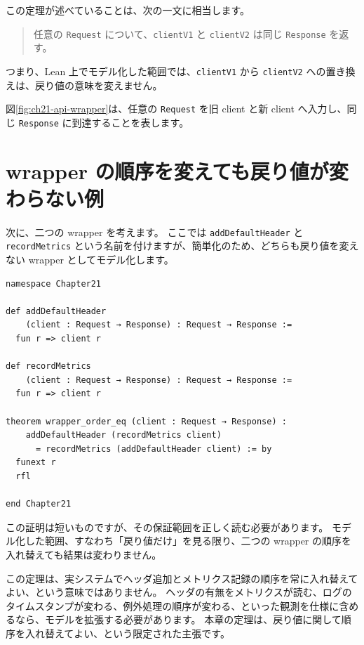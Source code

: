 この定理が述べていることは、次の一文に相当します。

\begin{quote}
任意の \texttt{Request} について、\texttt{clientV1} と \texttt{clientV2} は同じ \texttt{Response} を返す。
\end{quote}

つまり、Lean 上でモデル化した範囲では、\texttt{clientV1} から \texttt{clientV2} への置き換えは、戻り値の意味を変えません。

図\ref{fig:ch21-api-wrapper}は、任意の \texttt{Request} を旧 client と新 client へ入力し、同じ \texttt{Response} に到達することを表します。


\section{wrapper の順序を変えても戻り値が変わらない例}

次に、二つの wrapper を考えます。
ここでは \texttt{addDefaultHeader} と \texttt{recordMetrics} という名前を付けますが、簡単化のため、どちらも戻り値を変えない wrapper としてモデル化します。

\begin{listing}[htbp]
\begin{verbatim}
namespace Chapter21

def addDefaultHeader
    (client : Request → Response) : Request → Response :=
  fun r => client r

def recordMetrics
    (client : Request → Response) : Request → Response :=
  fun r => client r

theorem wrapper_order_eq (client : Request → Response) :
    addDefaultHeader (recordMetrics client)
      = recordMetrics (addDefaultHeader client) := by
  funext r
  rfl

end Chapter21
\end{verbatim}
\caption{\texttt{wrapper\_order\_eq}}
\label{lst:ch21-wrapper-order}
\end{listing}

この証明は短いものですが、その保証範囲を正しく読む必要があります。
モデル化した範囲、すなわち「戻り値だけ」を見る限り、二つの wrapper の順序を入れ替えても結果は変わりません。

この定理は、実システムでヘッダ追加とメトリクス記録の順序を常に入れ替えてよい、という意味ではありません。
ヘッダの有無をメトリクスが読む、ログのタイムスタンプが変わる、例外処理の順序が変わる、といった観測を仕様に含めるなら、モデルを拡張する必要があります。
本章の定理は、戻り値に関して順序を入れ替えてよい、という限定された主張です。

